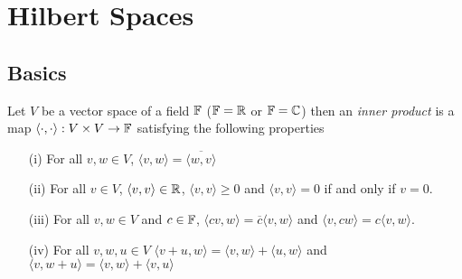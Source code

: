 \chapter{Hilbert Spaces}

\section{Basics}

\begin{defn}Let $V$ be a vector space of a field $\mathbb{F}$ ($\mathbb{F} = \mathbb{R}$ or $\mathbb{F} = \mathbb{C}$) then an
  \emph{inner product} is a map $\langle \cdot , \cdot \rangle : V \times V \to \mathbb{F}$ 
satisfying the following properties
\begin{itemize}
\item[(i)]  For all $v,w \in V$, $\langle v, w \rangle = \overline{\langle w, v \rangle}$
\item[(ii)] For all $v \in V$, $\langle v,v \rangle \in \mathbb{R}$, $\langle v,v \rangle \geq 0$ and $\langle v,v \rangle = 0$ if and only if $v=0$.
\item[(iii)] For all $v,w \in V$ and $c \in \mathbb{F}$, $\langle cv, w \rangle = \overline{c} \langle v,w \rangle$ and $ \langle v,cw \rangle = c \langle v,w \rangle$.
\item[(iv)] For all $v,w,u \in V$ $\langle v + u, w \rangle = \langle v,w \rangle + \langle u, w \rangle$ and $\langle v, w+u \rangle = \langle v,w \rangle + \langle v, u \rangle$
\end{itemize}
\end{defn}

